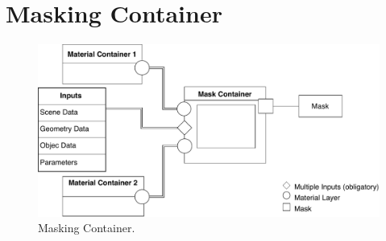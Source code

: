 \section{Masking Container}

	\begin{figure}
		\centering
		\includegraphics[width=0.75\linewidth]{images/04cha_04_LayeredMaterialComponent_MaskingContainer.pdf}
		\caption{Masking Container.}
		\label{fig:MaskingContainer}
	\end{figure}

